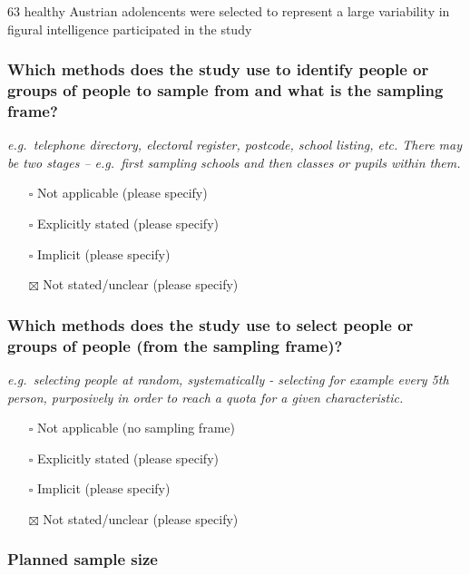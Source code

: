 \documentclass[
  doc, a4paper]{apa7}
\providecommand{\tightlist}{%
  \setlength{\itemsep}{0pt}\setlength{\parskip}{0pt}}
\begin{document}
63 healthy Austrian adolencents were selected to represent a large variability in figural intelligence participated in the study

\subsubsection{Which methods does the study use to identify people or groups of people to sample from and what is the sampling frame?}\label{which-methods-does-the-study-use-to-identify-people-or-groups-of-people-to-sample-from-and-what-is-the-sampling-frame}

\emph{e.g.~telephone directory, electoral register, postcode, school listing, etc. There may be two stages -- e.g.~first sampling schools and then classes or pupils within them.}

\begin{itemize}
\tightlist
\item[$\square$]
  Not applicable (please specify)
\item[$\square$]
  Explicitly stated (please specify)
\item[$\square$]
  Implicit (please specify)
\item[$\boxtimes$]
  Not stated/unclear (please specify)
\end{itemize}

\subsubsection{Which methods does the study use to select people or groups of people (from the sampling frame)?}\label{which-methods-does-the-study-use-to-select-people-or-groups-of-people-from-the-sampling-frame}

\emph{e.g.~selecting people at random, systematically - selecting for example every 5th person, purposively in order to reach a quota for a given characteristic.}

\begin{itemize}
\tightlist
\item[$\square$]
  Not applicable (no sampling frame)
\item[$\square$]
  Explicitly stated (please specify)
\item[$\square$]
  Implicit (please specify)
\item[$\boxtimes$]
  Not stated/unclear (please specify)
\end{itemize}

\subsubsection{Planned sample size}\label{planned-sample-size}
\end{document}
